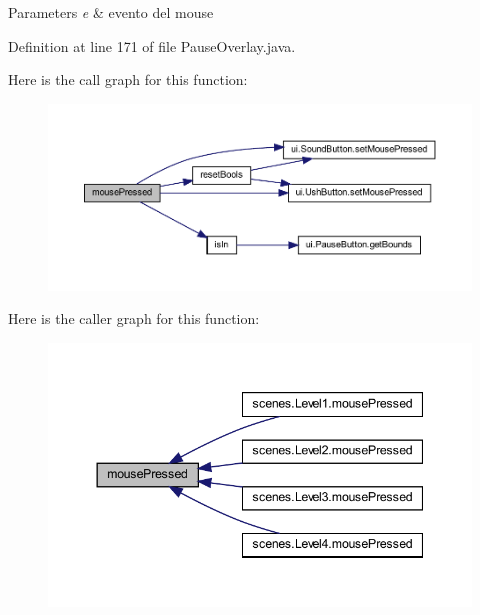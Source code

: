 \begin{DoxyParams}{Parameters}
{\em e} & evento del mouse \\
\hline
\end{DoxyParams}


Definition at line 171 of file Pause\+Overlay.\+java.

Here is the call graph for this function\+:\nopagebreak
\begin{figure}[H]
\begin{center}
\leavevmode
\includegraphics[width=350pt]{classui_1_1_pause_overlay_aed82e1ce3dd3cf283d508c3ba3be70ef_cgraph}
\end{center}
\end{figure}
Here is the caller graph for this function\+:\nopagebreak
\begin{figure}[H]
\begin{center}
\leavevmode
\includegraphics[width=344pt]{classui_1_1_pause_overlay_aed82e1ce3dd3cf283d508c3ba3be70ef_icgraph}
\end{center}
\end{figure}
\mbox{\label{classui_1_1_pause_overlay_a87a07291794e15052db67f945d90853e}} 
